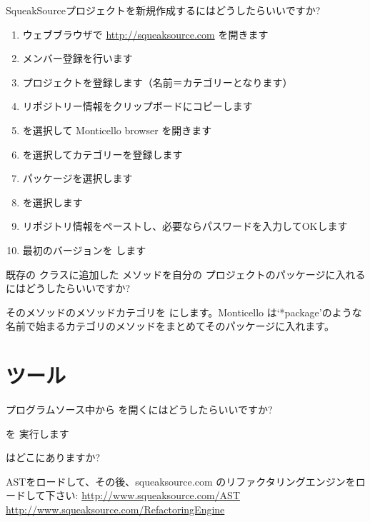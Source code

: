 \documentclass[a4paper,10pt,twoside]{book}
\begin{document}
\begin{faq}
SqueakSourceプロジェクトを新規作成するにはどうしたらいいですか?
\end{faq}
\answer
\begin{enumerate}
  \item ウェブブラウザで \url{http://squeaksource.com} を開きます
  \item メンバー登録を行います
  \item プロジェクトを登録します（名前＝カテゴリーとなります）
  \item リポジトリー情報をクリップボードにコピーします
  \item {} を選択して Monticello browser を開きます
  \item {} を選択してカテゴリーを登録します
  \item パッケージを選択します
  \item {} を選択します
  \item リポジトリ情報をペーストし、必要ならパスワードを入力してOKします
  \item 最初のバージョンを  します
\end{enumerate}

\begin{faq}
既存の  クラスに追加した  メソッドを自分の  プロジェクトのパッケージに入れるにはどうしたらいいですか?
\end{faq}
\answer
そのメソッドのメソッドカテゴリを  にします。Monticello は‘*package’のような名前で始まるカテゴリのメソッドをまとめてそのパッケージに入れます。

\section{ツール}

\begin{faq}
プログラムソース中から   を開くにはどうしたらいいですか?
\end{faq}
\answer
  を 実行します

\begin{faq}
 はどこにありますか? 
\end{faq}
\answer
ASTをロードして、その後、squeaksource.com のリファクタリングエンジンをロードして下さい:
\url{http://www.squeaksource.com/AST}
\url{http://www.squeaksource.com/RefactoringEngine}
\end{document}
